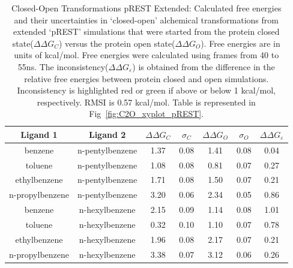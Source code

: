 \begin{table}[!htb]
\centering
\caption{Closed-Open Transformations pREST Extended:
Calculated free energies and their uncertainties in `closed-open' alchemical transformations from extended `pREST' simulations that were started from the protein closed state(\boldmath$\Delta\Delta G_{C}$) versus the protein open state(\boldmath$\Delta\Delta G_{O}$). 
 Free energies are in units of kcal/mol.
 Free energies were calculated using frames from 40 to 55ns. 
 The inconsistency(\boldmath$\Delta\Delta G_{\varepsilon}$) is obtained from the difference in the relative free energies between protein closed and open simulations. 
 Inconsistency is highlighted red or green if above or below 1 kcal/mol, respectively.
 RMSI is 0.57 kcal/mol.
 Table is represented in Fig~\ref{fig:C2O_xyplot_pREST}.
}
\label{tbl:C-O_pREST-40-55ns}
\begin{tabular}{|c|c|c|c|c|c|c|}
\hline
\textbf{Ligand 1}       & \textbf{Ligand 2}    & \boldmath$\Delta\Delta G_{C}$ & \boldmath$\sigma_{C}$ & \boldmath$\Delta\Delta G_{O}$ & \boldmath$\sigma_{O}$ & \boldmath$\Delta\Delta G_{\varepsilon}$ \\ \hline
benzene         & n-pentylbenzene & 1.37       & 0.08     & 1.41    & 0.08      & \cellcolor[HTML]{9AFF99}0.04 \\ \hline
toluene         & n-pentylbenzene & 1.08       & 0.08     & 0.81    & 0.07      & \cellcolor[HTML]{9AFF99}0.27 \\ \hline
ethylbenzene    & n-pentylbenzene & 1.71       & 0.08     & 1.50    & 0.07      & \cellcolor[HTML]{9AFF99}0.21 \\ \hline
n-propylbenzene & n-pentylbenzene & 3.20       & 0.06     & 2.34    & 0.05      & \cellcolor[HTML]{9AFF99}0.86 \\ \hline
benzene         & n-hexylbenzene  & 2.15       & 0.09     & 1.14    & 0.08      & \cellcolor[HTML]{FFCCC9}1.01 \\ \hline
toluene         & n-hexylbenzene  & 0.32       & 0.10     & 1.10    & 0.07      & \cellcolor[HTML]{9AFF99}0.78 \\ \hline
ethylbenzene    & n-hexylbenzene  & 1.96       & 0.08     & 2.17    & 0.07      & \cellcolor[HTML]{9AFF99}0.21 \\ \hline
n-propylbenzene & n-hexylbenzene  & 3.38       & 0.07     & 3.12    & 0.06      & \cellcolor[HTML]{9AFF99}0.26 \\ \hline
\end{tabular}
\end{table}



